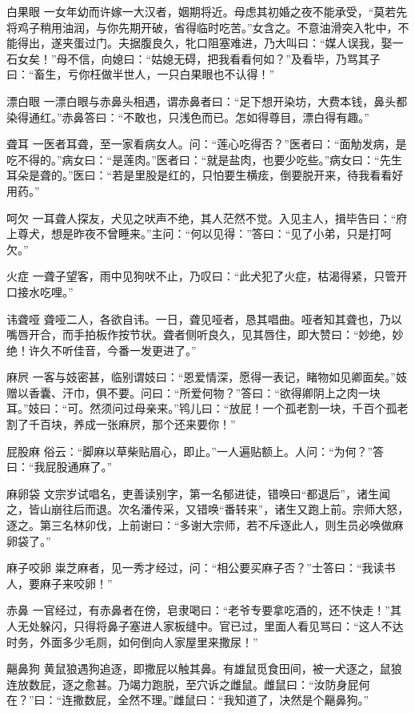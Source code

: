 \documentclass[12pt,UTF8]{ctexbook}
\begin{document}
白果眼
一女年幼而许嫁一大汉者，姻期将近。母虑其初婚之夜不能承受，“莫若先将鸡子稍用油润，与你先期开破，省得临时吃苦。”女含之。不意油滑突入牝中，不能得出，遂夹蛋过门。夫据腹良久，牝口阻塞难进，乃大叫曰：“媒人误我，娶一石女矣！”母不信，向媳曰：“姑媳无碍，把我看看何如？”及看毕，乃骂其子曰：“畜生，亏你枉做半世人，一只白果眼也不认得！”

漂白眼
一漂白眼与赤鼻头相遇，谓赤鼻者曰：“足下想开染坊，大费本钱，鼻头都染得通红。”赤鼻答曰：“不敢也，只浅色而已。怎如得尊目，漂白得有趣。”

聋耳
一医者耳聋，至一家看病女人。问：“莲心吃得否？”医者曰：“面觔发病，是吃不得的。”病女曰：“是莲肉。”医者曰：“就是盐肉，也要少吃些。”病女曰：“先生耳朵是聋的。”医曰：“若是里股是红的，只怕要生横痃，倒要脱开来，待我看看好用药。”

呵欠
一耳聋人探友，犬见之吠声不绝，其人茫然不觉。入见主人，揖毕告曰：“府上尊犬，想是昨夜不曾睡来。”主问：“何以见得：”答曰：“见了小弟，只是打呵欠。”

火症
一聋子望客，雨中见狗吠不止，乃叹曰：“此犬犯了火症，枯渴得紧，只管开口接水吃哩。”

讳聋哑
聋哑二人，各欲自讳。一日，聋见哑者，恳其唱曲。哑者知其聋也，乃以嘴唇开合，而手拍板作按节状。聋者侧听良久，见其唇住，即大赞曰：“妙绝，妙绝！许久不听佳音，今番一发更进了。”

麻屄
一客与妓密甚，临别谓妓曰：“恩爱情深，愿得一表记，睹物如见卿面矣。”妓赠以香囊、汗巾，俱不要。问曰：“所爱何物？”答曰：“欲得卿阴上之肉一块耳。”妓曰：“可。然须问过母亲来。”鸨儿曰：“放屁！一个孤老割一块，千百个孤老割了千百块，养成一张麻屄，那个还来要你！”

屁股麻
俗云：“脚麻以草柴贴眉心，即止。”一人遍贴额上。人问：“为何？”答曰：“我屁股通麻了。”

麻卵袋
文宗岁试唱名，吏善读别字，第一名郁进徒，错唤曰“都退后”，诸生闻之，皆山崩往后而退。次名潘传采，又错唤“番转来”，诸生又跑上前。宗师大怒，逐之。第三名林卯伐，上前谢曰：“多谢大宗师，若不斥逐此人，则生员必唤做麻卵袋了。”

麻子咬卵
粜芝麻者，见一秀才经过，问：“相公要买麻子否？”士答曰：“我读书人，要麻子来咬卵！”

赤鼻
一官经过，有赤鼻者在傍，皂隶喝曰：“老爷专要拿吃酒的，还不快走！”其人无处躲闪，只得将鼻子塞进人家板缝中。官已过，里面人看见骂曰：“这人不达时务，外面多少毛厕，如何倒向人家屋里来撒尿！”

齆鼻狗
黄鼠狼遇狗追逐，即撒屁以触其鼻。有雄鼠觅食田间，被一犬逐之，鼠狼连放数屁，逐之愈甚。乃竭力跑脱，至穴诉之雌鼠。雌鼠曰：“汝防身屁何在？”曰：“连撒数屁，全然不理。”雌鼠曰：“我知道了，决然是个齆鼻狗。”
\end{document}
